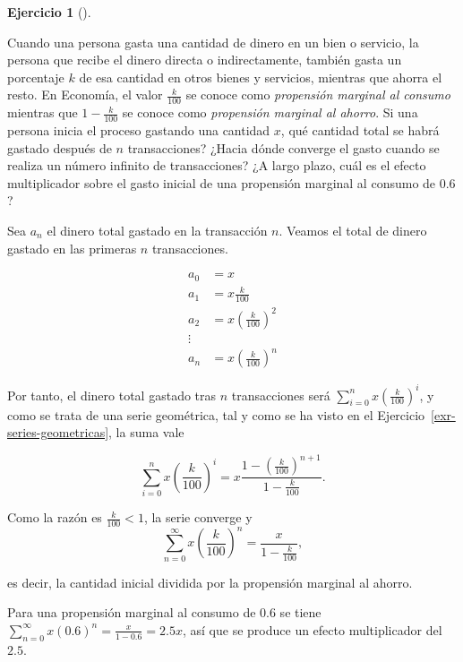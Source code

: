 \documentclass[
  a4paper,
]{scrreport}
\theoremstyle{definition}
\newtheorem{exercise}{Ejercicio}[chapter]
\theoremstyle{remark}
\begin{document}
\begin{exercise}[]\protect\hypertarget{exr-propensiones-marginales-gasto-ahorro}{}\label{exr-propensiones-marginales-gasto-ahorro}

Cuando una persona gasta una cantidad de dinero en un bien o servicio,
la persona que recibe el dinero directa o indirectamente, también gasta
un porcentaje \(k\) de esa cantidad en otros bienes y servicios,
mientras que ahorra el resto. En Economía, el valor \(\frac{k}{100}\) se
conoce como \emph{propensión marginal al consumo} mientras que
\(1-\frac{k}{100}\) se conoce como \emph{propensión marginal al ahorro}.
Si una persona inicia el proceso gastando una cantidad \(x\), qué
cantidad total se habrá gastado después de \(n\) transacciones? ¿Hacia
dónde converge el gasto cuando se realiza un número infinito de
transacciones? ¿A largo plazo, cuál es el efecto multiplicador sobre el
gasto inicial de una propensión marginal al consumo de \(0.6\)?

\end{exercise}

\begin{tcolorbox}[enhanced jigsaw, rightrule=.15mm, opacityback=0, bottomtitle=1mm, titlerule=0mm, toprule=.15mm, breakable, colframe=quarto-callout-tip-color-frame, left=2mm, opacitybacktitle=0.6, title=\textcolor{quarto-callout-tip-color}{\faLightbulb}\hspace{0.5em}{Solución}, toptitle=1mm, colback=white, colbacktitle=quarto-callout-tip-color!10!white, arc=.35mm, bottomrule=.15mm, coltitle=black, leftrule=.75mm]

Sea \(a_n\) el dinero total gastado en la transacción \(n\). Veamos el
total de dinero gastado en las primeras \(n\) transacciones.

\begin{align*}
a_0 &=  x\\
a_1 &= x\frac{k}{100}\\
a_2 &= x\left(\frac{k}{100}\right)^2\\
\vdots\\
a_n &= x\left(\frac{k}{100}\right)^n
\end{align*}

Por tanto, el dinero total gastado tras \(n\) transacciones será
\(\sum_{i=0}^n x\left(\frac{k}{100}\right)^i\), y como se trata de una
serie geométrica, tal y como se ha visto en el
Ejercicio~\ref{exr-series-geometricas}, la suma vale

\[
\sum_{i=0}^n x\left(\frac{k}{100}\right)^i = x\frac{1-\left(\frac{k}{100}\right)^{n+1}}{1-\frac{k}{100}}.
\]

Como la razón es \(\frac{k}{100}<1\), la serie converge y \[
\sum_{n=0}^\infty x\left(\frac{k}{100}\right)^n = \frac{x}{1-\frac{k}{100}},
\]

es decir, la cantidad inicial dividida por la propensión marginal al
ahorro.

Para una propensión marginal al consumo de \(0.6\) se tiene
\(\sum_{n=0}^\infty x\left(0.6\right)^n = \frac{x}{1-0.6} = 2.5x\), así
que se produce un efecto multiplicador del \(2.5\).

\end{tcolorbox}
\end{document}
